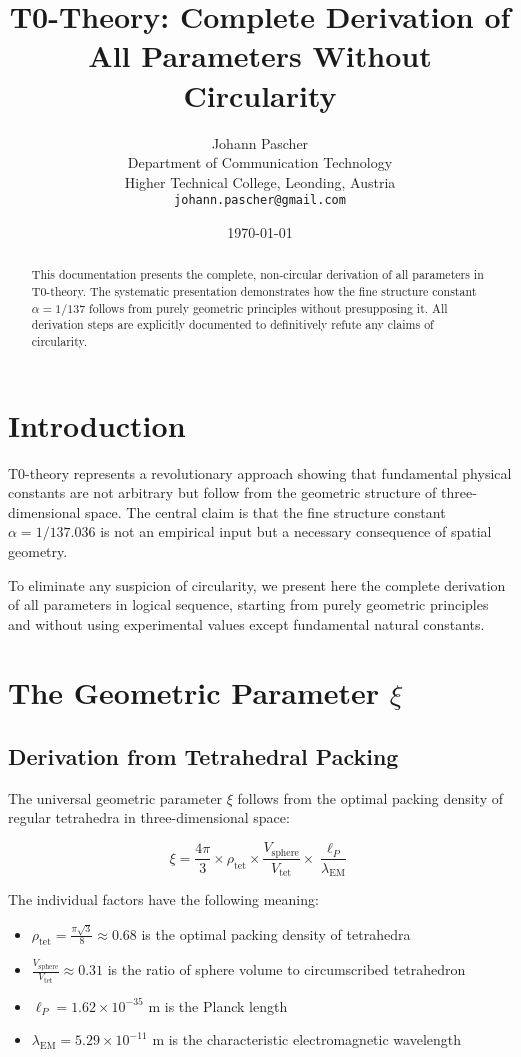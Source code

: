 \documentclass[12pt,a4paper]{article}
\title{T0-Theory: Complete Derivation of All Parameters Without Circularity}
\author{Johann Pascher\\
	Department of Communication Technology\\
	Higher Technical College, Leonding, Austria\\
	\texttt{johann.pascher@gmail.com}}
\date{\today}
\begin{document}
	
	\maketitle
	
	\begin{abstract}
		This documentation presents the complete, non-circular derivation of all parameters in T0-theory. The systematic presentation demonstrates how the fine structure constant $\alpha = 1/137$ follows from purely geometric principles without presupposing it. All derivation steps are explicitly documented to definitively refute any claims of circularity.
	\end{abstract}

	
	\section{Introduction}
	
	T0-theory represents a revolutionary approach showing that fundamental physical constants are not arbitrary but follow from the geometric structure of three-dimensional space. The central claim is that the fine structure constant $\alpha = 1/137.036$ is not an empirical input but a necessary consequence of spatial geometry.
	
	To eliminate any suspicion of circularity, we present here the complete derivation of all parameters in logical sequence, starting from purely geometric principles and without using experimental values except fundamental natural constants.
\tableofcontents
\newpage	
	\section{The Geometric Parameter $\xi$}
	
	\subsection{Derivation from Tetrahedral Packing}
	
	The universal geometric parameter $\xi$ follows from the optimal packing density of regular tetrahedra in three-dimensional space:
	
	\begin{equation}
		\xi = \frac{4\pi}{3} \times \rho_{\text{tet}} \times \frac{V_{\text{sphere}}}{V_{\text{tet}}} \times \frac{\ell_P}{\lambda_{\text{EM}}}
	\end{equation}
	
	The individual factors have the following meaning:
	\begin{itemize}
		\item $\rho_{\text{tet}} = \frac{\pi\sqrt{3}}{8} \approx 0.68$ is the optimal packing density of tetrahedra
		\item $\frac{V_{\text{sphere}}}{V_{\text{tet}}} \approx 0.31$ is the ratio of sphere volume to circumscribed tetrahedron
		\item $\ell_P = 1.62 \times 10^{-35}$ m is the Planck length
		\item $\lambda_{\text{EM}} = 5.29 \times 10^{-11}$ m is the characteristic electromagnetic wavelength
	\end{itemize}
	
\end{document}
